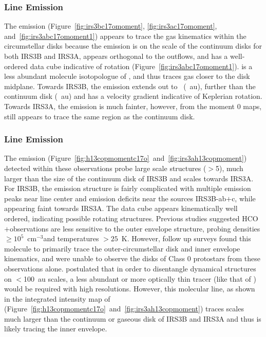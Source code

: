 \documentclass[twocolumn, 12pt, trackchanges]{aastex63}
\begin{document}
\subsubsection{\cso\space Line Emission}\label{sec:csoemission}
The \cso\space emission (Figure~\ref{fig:irs3bc17omoment}, \ref{fig:irs3ac17omoment}, and~\ref{fig:irs3abc17omoment1}) appears to trace the gas kinematics within the circumstellar disks because the emission is on the scale of the continuum disks for both IRS3B and IRS3A, appears orthogonal to the outflows, and has a well-ordered data cube indicative of rotation (Figure~\ref{fig:irs3abc17omoment1}). \cso\space is a less abundant molecule \citep[ISM $\lbrack$\co$\rbrack/\lbrack$\cso$\rbrack\approx$1700:1; e.g.][]{1994ARAA..32..191W} isotopologue of \co\space\citep[ISM $\lbrack H_{2}\rbrack/\lbrack$\co$\rbrack\approx$10$^{4}$:1; e.g.][]{2009AA...503..323V}, and thus traces gas closer to the disk midplane. Towards IRS3B, the emission extends out to ~(~au), further than the continuum disk (~au) and has a velocity gradient indicative of Keplerian rotation. Towards IRS3A, the emission is much fainter, however, from the moment 0 maps, \cso\space still appears to trace the same region as the continuum disk.

\subsubsection{\htcop\space Line Emission}\label{sec:htcopemission}
The \htcop\space emission (Figure~\ref{fig:h13copmomentc17o}~and~\ref{fig:irs3ah13copmoment}) detected within these observations probe large scale structures ($>$5\arcsec), much larger than the size of the continuum disk of IRS3B and scales  towards IRS3A. For IRS3B, the emission structure is fairly complicated with multiple emission peaks near line center and emission deficits near the sources IRS3B-ab$+$c, while appearing faint towards IRS3A. The data cube appears kinematically well ordered, indicating possible rotating structures. Previous studies suggested HCO$+$\space observations are less sensitive to the outer envelope structure, probing densities $\ge10^{5}$~cm$^{-3}$\space and temperatures $>25$~K\space \citep{1999ARAA..37..311E}. However, follow up surveys \citep{2009AA...507..861J} found this molecule to primarily trace the outer-circumstellar disk and inner envelope kinematics, and were unable to observe the disks of Class 0 protostars from these observations alone. \citet{2009AA...507..861J}\space postulated that in order to disentangle dynamical structures on $<$100~au scales, a less abundant or more optically thin tracer (like that of \htcop) would be required with high resolutions. However, this molecular line, as shown in the integrated intensity map of \htcop\space (Figure~\ref{fig:h13copmomentc17o}~and~\ref{fig:irs3ah13copmoment}) traces scales much larger than the continuum or gaseous disk of IRS3B and IRS3A and thus is likely tracing the inner envelope.
\end{document}
